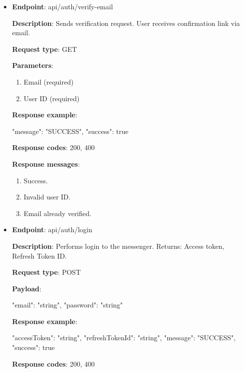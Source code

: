 \begin{itemize}
    \item \textbf{Endpoint}: api/auth/verify-email

    \textbf{Description}: Sends verification request.
    User receives confirmation link via email.

    \textbf{Request type}: GET

    \textbf{Parameters}:

    \begin{enumerate}
        \item Email (required)
        \item User ID (required)
    \end{enumerate}

    \textbf{Response example}:

    \begin{spverbatim}
    {
        "message": "SUCCESS",
        "success": true
    }
    \end{spverbatim}

    \textbf{Response codes}: 200, 400

    \textbf{Response messages}:
    \begin{enumerate}
        \item Success.
        \item Invalid user ID.
        \item Email already verified.
    \end{enumerate}

    \item \textbf{Endpoint}: api/auth/login

    \textbf{Description}: Performs login to the messenger.
    Returns: Access token, Refresh Token ID.

    \textbf{Request type}: POST

    \textbf{Payload}:

    \begin{spverbatim}
    {
        "email": "string",
        "password": "string"
    }
    \end{spverbatim}

    \textbf{Response example}:

    \begin{spverbatim}
    {
        "accessToken": "string",
        "refreshTokenId": "string",
        "message": "SUCCESS",
        "success": true
    }
    \end{spverbatim}

    \textbf{Response codes}: 200, 400


\end{itemize}

